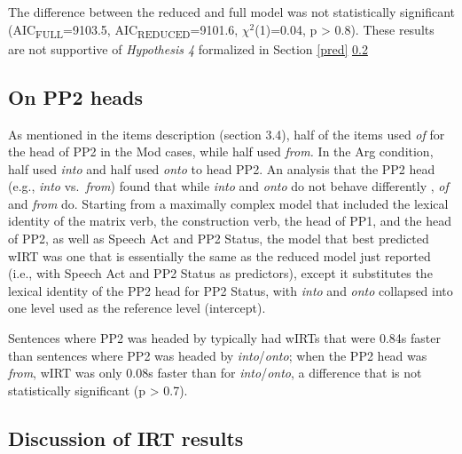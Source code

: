 \documentclass[12pt,oneside]{book}
\begin{document}
The difference between the reduced and full model was not statistically significant (AIC\textsubscript{FULL}=9103.5, AIC\textsubscript{REDUCED}=9101.6, \(\chi^2\)(1)=0.04, p \textgreater{} 0.8). These results are not supportive of \emph{Hypothesis 4} formalized in Section \ref{pred} \ref{irtdiscuss} 

\hypertarget{pp2h}{%
\subsection{On PP2 heads}\label{pp2h}}

As mentioned in the items description (section 3.4), half of the items used \emph{of} for the head of PP2 in the Mod cases, while half used \emph{from.} In the Arg condition, half used \emph{into} and half used \emph{onto} to head PP2. An analysis that  the PP2 head (e.g., \emph{into} vs.~\emph{from}) found that while \emph{into} and \emph{onto} do not behave differently , \emph{of} and \emph{from} do. Starting from a maximally complex model that included the lexical identity of the matrix verb, the construction verb, the head of PP1, and the head of PP2, as well as Speech Act and PP2 Status, the model that best predicted wIRT was one that is essentially the same as the reduced model just reported (i.e., with Speech Act and PP2 Status as predictors), except  it substitutes the lexical identity of the PP2 head for PP2 Status, with \emph{into} and \emph{onto} collapsed into one level used as the reference level (intercept).

Sentences where PP2 was headed by \emph{} typically had wIRTs that were 0.84s faster than sentences where PP2 was headed by \emph{into}/\emph{onto}; when the PP2 head was \emph{from}, wIRT was only 0.08s faster than for \emph{into}/\emph{onto}, a difference that is not statistically significant (p \textgreater{} 0.7).

\hypertarget{irtdiscuss}{%
\subsection{Discussion of IRT results}\label{irtdiscuss}}
\end{document}
